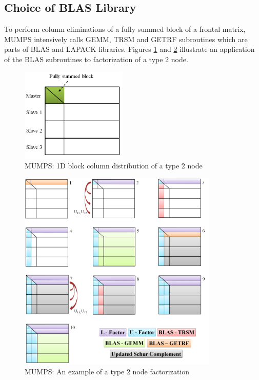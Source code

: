 \subsection{Choice of BLAS Library}
\label{subseq:blas-comparison}


To perform column eliminations of a fully summed block of a frontal matrix, MUMPS intensively calls GEMM, TRSM and GETRF subroutines which are parts of BLAS and LAPACK libraries. Figures \ref{fig:mumps:type-2-frontal-matrix} and  \ref{fig:mumps:steps-of-type-2-factorization} illustrate an application of the BLAS subroutines to factorization of a type 2 node.\\


\figpointer{\ref{fig:mumps:type-2-frontal-matrix}}
\begin{figure}[htpb]
  \centering
  \includegraphics[width=0.45\textwidth]{figures/chapter-2/mumps-type-2-frontal-matrix.png}
\caption{MUMPS: 1D block column distribution of a type 2 node}
\label{fig:mumps:type-2-frontal-matrix}
\end{figure}


\figpointer{\ref{fig:mumps:steps-of-type-2-factorization}}
\begin{figure}[htpb]
  \centering
  \includegraphics[width=0.85\textwidth]{figures/chapter-2/mumps-type-2-part-1.png}
\caption{MUMPS: An example of a type 2 node factorization}
\label{fig:mumps:steps-of-type-2-factorization}
\end{figure}


